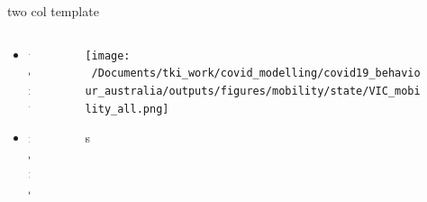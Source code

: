 \documentclass[
  ignorenonframetext,
  aspectratio=149,
]{beamer}
\providecommand{\tightlist}{%
  \setlength{\itemsep}{0pt}\setlength{\parskip}{0pt}}\usepackage{longtable,booktabs,array}
\begin{document}
\begin{frame}{two col template}
\label{two-col-template}
\begin{columns}[T]
\begin{column}{0.48\textwidth}
\begin{itemize}
\tightlist
\item
  text
\item
  more
\end{itemize}
\end{column}

\begin{column}{0.48\textwidth}
\begin{figure}[H]

{\centering \texttt{[image: ~/Documents/tki\_work/covid\_modelling/covid19\_behaviour\_australia/outputs/figures/mobility/state/VIC\_mobility\_all.png]}

}

\caption{s}

\end{figure}%
\end{column}
\end{columns}
\end{frame}
\end{document}
